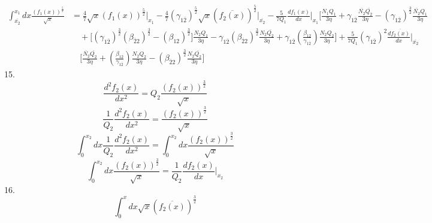 \documentclass[fleqn, 10pt]{article}
\begin{document}
                      \begin{equation}                  \begin{split}   \int^{x_1}_{\overline{x_{2}}}dx \frac{(f_1(x))^\frac{5}{2}}{\sqrt{x}} &= \frac{4}{7}\sqrt{x}(f_1(x))^\frac{5}{2}\Bigg|_{x_1} -  \frac{4}{7}(\gamma_{1\overline{2}})^\frac{5}{2} \sqrt{x} (\overline{f_{2}(x)})^\frac{5}{2} \Bigg|_{\overline{x_{2}}}- \frac{5}{7Q_1} \frac{df_1(x)}{dx}\Bigg|_{x_1}\Biggl[\frac{N_1Q_1}{3\eta} + \gamma_{1\overline{2}} \frac{\overline{N_{2}}\overline{Q_{2}}}{3\eta} - (\gamma_{1\overline{2}})^\frac{3}{2}\frac{\overline{N_{2}}Q_1}{3\eta} \\ & \quad  +\biggl[(\gamma_{1\overline{2}})^\frac{3}{2}(\beta_{\overline{2}2})^\frac{3}{2} - (\beta_{12})^\frac{3}{2}\biggr] \frac{N_{2}Q_1}{3\eta} - \gamma_{1\overline{2}}(\beta_{\overline{2}2})^\frac{3}{2}\frac{N_{2}\overline{Q_{2}}}{3\eta}   + \gamma_{1\overline{2}}\left(\frac{\beta_{12}}{\gamma_{1\overline{2}}}\right)\frac{N_{2}Q_{2}}{3\eta}\Biggr] +  \frac{5}{7Q_1}(\gamma_{1\overline{2}})^2
\frac{d\overline{f_{2}(x)}}{dx}\Bigg|_{\overline{x_{2}}} \\ & \quad \biggl[ \frac{\overline{N_{2}}\overline{Q_{2}}}{3\eta}  + \left(\frac{\beta_{12}}{\gamma_{1\overline{2}}}\right)\frac{N_{2}Q_{2}}{3\eta} - (\beta_{\overline{2}2})^\frac{3}{2} \frac{N_{2}\overline{Q_{2}}}{3\eta}\biggr]
\end{split}
\label{40}
\end{equation}
15.
\begin{equation*}
    \frac{d^2f_{2}(x)}{dx^2} = Q_{2} \frac{(f_{2}(x))^\frac{3}{2}}{\sqrt{x}} 
\end{equation*}
\begin{equation*}
    \frac{1}{Q_{2}}\frac{d^2f_{2}(x)}{dx^2} = \frac{(f_{2}(x))^\frac{3}{2}}{\sqrt{x}}
\end{equation*}
\begin{equation*}
    \int^{x_{2}}_0 dx \frac{1}{Q_{2}}\frac{d^2f_{2}(x)}{dx^2} = \int^{x_{2}}_0 dx \frac{(f_{2}(x))^\frac{3}{2}}{\sqrt{x}}
\end{equation*}
\begin{equation}
    \int^{x_{2}}_0 dx \frac{(f_{2}(x))^\frac{3}{2}}{\sqrt{x}} =  \frac{1}{Q_{2}} \frac{df_{2}(x)}{dx}\Bigg|_{x_{2}}
    \label{44}
\end{equation}
 16. 
                \begin{equation*}
                    \int^{x}_0 dx \sqrt{x} (\overline{f_{2}(x)})^\frac{3}{2}
                \end{equation*}
\end{document}
